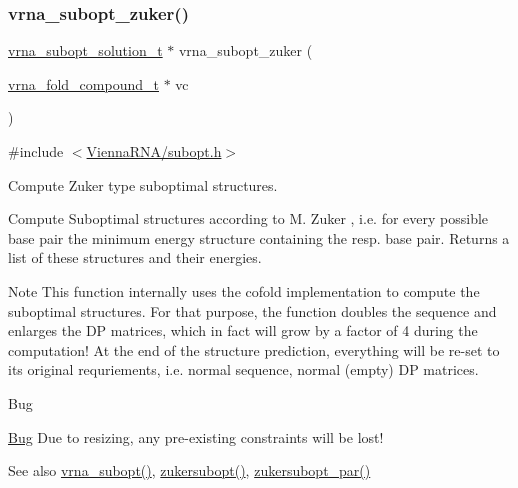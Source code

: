 \subsubsection{\texorpdfstring{vrna\+\_\+subopt\+\_\+zuker()}{vrna\_subopt\_zuker()}}
{\footnotesize\ttfamily \hyperlink{subopt_8h_a01ae9a0f27d245d89f705afd843fc457}{vrna\+\_\+subopt\+\_\+solution\+\_\+t} $\ast$ vrna\+\_\+subopt\+\_\+zuker (\begin{DoxyParamCaption}\item[{\hyperlink{group__fold__compound_ga1b0cef17fd40466cef5968eaeeff6166}{vrna\+\_\+fold\+\_\+compound\+\_\+t} $\ast$}]{vc }\end{DoxyParamCaption})}



{\ttfamily \#include $<$\hyperlink{subopt_8h}{Vienna\+R\+N\+A/subopt.\+h}$>$}



Compute Zuker type suboptimal structures. 

Compute Suboptimal structures according to M. Zuker \cite{zuker:1989} , i.\+e. for every possible base pair the minimum energy structure containing the resp. base pair. Returns a list of these structures and their energies.

\begin{DoxyNote}{Note}
This function internally uses the cofold implementation to compute the suboptimal structures. For that purpose, the function doubles the sequence and enlarges the DP matrices, which in fact will grow by a factor of 4 during the computation! At the end of the structure prediction, everything will be re-\/set to its original requriements, i.\+e. normal sequence, normal (empty) DP matrices.
\end{DoxyNote}
\begin{DoxyRefDesc}{Bug}
\item[\hyperlink{bug__bug000002}{Bug}]Due to resizing, any pre-\/existing constraints will be lost!\end{DoxyRefDesc}


\begin{DoxySeeAlso}{See also}
\hyperlink{group__subopt__wuchty_ga0f11d738fb8c8b1885a90c11c8931ff6}{vrna\+\_\+subopt()}, \hyperlink{group__subopt__zuker_ga0d5104e3ecf119d8eabd40aa5fe47f90}{zukersubopt()}, \hyperlink{group__subopt__zuker_gab6d0ea8cc1d02f6dd831ca81043c9eb8}{zukersubopt\+\_\+par()}
\end{DoxySeeAlso}

